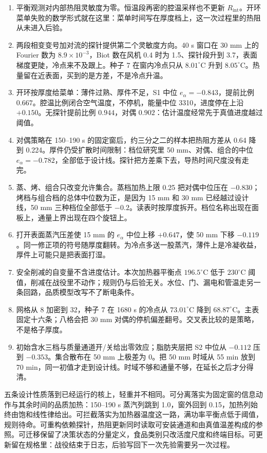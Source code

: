 \begin{enumerate}
\item 平衡观测对内部热阻灵敏度为零。恒温段再密的腔温采样也不更新 \(R_{\mathrm{int}}\)。开环菜单失败的数学形式就在这里：菜单时间写在厚度档上，这一次过程里的热阻从未进入后验。
\item 两段相变变号加对流的探针提供第二个灵敏度方向。40 s 窗口在 30 mm 上的 Fourier 数为 \(8.9\times 10^{-3}\)，Biot 数在风机 0.4 时为 1.5、探针段升到 3.7，表面梯度更陡，冷点来不及跟上。种子 7 在窗内冷点只从 \(8.01^\circ\mathrm{C}\) 升到 \(8.05^\circ\mathrm{C}\)。热量留在近表面，买到的是方差，不是冷点升温。
\item 开环按厚度给菜单：薄件过熟、厚件不足，S1 中位 \(e_{\alpha}=-0.843\)，提前比例 \(0.667\)。腔温比例闭合空气温度，不停机，能量中位 3310，进度停在上沿 \(+0.150\)。无探针提前比例 \(0.944\)，对偶 \(0.902\)：估计温度经常先于真值进度越过阈值。
\item 对偶策略在 150--190 s 的固定窗后，约三分之二的样本把热阻方差从 0.64 降到 0.224。厚件仍受扩散时间限制：档位研究里 50 mm、对偶、组合的中位 \(e_{\alpha}=-0.782\)，全部低于设计线。探针把方差乘下去，导热时间尺度没有走完。
\item 蒸、烤、组合只改变允许集合。蒸档加热上限 0.25 把对偶中位压在 \(-0.830\)；烤档与组合档的总体中位数为正，是因为 15 mm 和 30 mm 已经越过设计线，50 mm 三种档位全部低于 \(-0.2\)。读表时按厚度拆开。档位名称出现在面板上，通量上界出现在四个旋钮上。
\item 打开表面蒸汽压差使 15 mm 的 \(e_{\alpha}\) 中位上移 \(+0.647\)，使 50 mm 下移 \(-0.119\)。同一修正项的符号随厚度翻转。为冷点多送一股蒸汽，薄件上是冷凝收益，厚件上可能只是把表面打湿。
\item 安全削减的自变量不含进度估计。本次加热器平衡点 \(196.5^\circ\mathrm{C}\) 低于 \(230^\circ\mathrm{C}\) 阈值，削减在战役里不动作；规则仍与后验无关。水位、门、漏电和管温走另一条回路，品质模型改写不了断电条件。
\item 网格从 8 加密到 32，种子 7 在 1680 s 的冷点从 \(73.01^\circ\mathrm{C}\) 降到 \(68.87^\circ\mathrm{C}\)。主表固定十六条；八格会把 30 mm 对偶的停机偏差翻号。交叉表比较的是策略，不是格子厚度。
\item 初始含水三档与质量通道开/关给出零效应；脂肪夹层把 S2 中位从 \(-0.112\) 压到 \(-0.353\)。集合散布在 50 mm 上极差为 0。把 50 mm 时域从 55 min 放到 70 min，同一初值才走到设计线。时域不够和通量不够，在延长之后才分得清。
\end{enumerate}

五条设计性质落到已经运行的核上，轻重并不相同。可分离落实为固定窗的信息动作与其余时间的品质加热：150--190 s 蒸汽列跳到 1.0，窗外回到 0.15，加热列始终由饱和线性律给出。可拦截落实为加热器温度这一路，满功率平衡点低于阈值，规则待命。可重构依赖探针，热阻更新同时读取可安装通道和由真值温差构成的参照。可迁移保留了决策状态的分量定义，食品类别只改活度尺度和终端目标。可更新留在规格里：战役结束于日志，后验写回下一次先验需要另一次过程。

